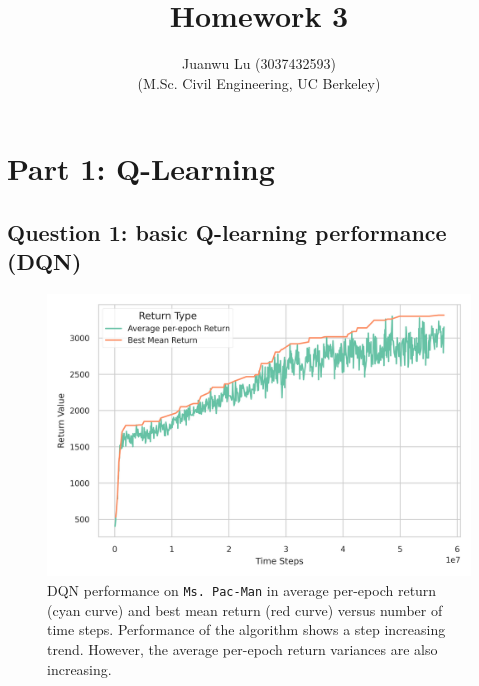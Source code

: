 \documentclass[10pt, letterpaper]{article}
\title{%
    \textbf{Homework 3}
}
\author{Juanwu Lu (3037432593)\\ \small(M.Sc. Civil Engineering, UC Berkeley)}
\date{}
\begin{document}
\maketitle
{}
\thispagestyle{fancy}
\pagestyle{plain}

\section{Part 1: Q-Learning}

\subsection*{Question 1: basic Q-learning performance (DQN)}
\begin{figure}[thbp]
    \centering
    \includegraphics[width=\textwidth]{./img/q1.png}
    \caption{DQN performance on \texttt{Ms. Pac-Man} in average per-epoch return (cyan curve) and best mean return (red curve) versus number of time steps. Performance of the algorithm shows a step increasing trend. However, the average per-epoch return variances are also increasing.}
    \label{fig: 1}
\end{figure}

\pagebreak
\end{document}
